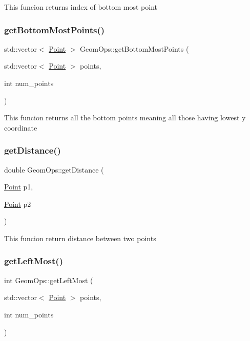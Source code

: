 This funcion returns index of bottom most point \mbox{\label{classGeomOps_acbab4d3b33a391c1169fedec1531212a}} 
\subsubsection{\texorpdfstring{get\+Bottom\+Most\+Points()}{getBottomMostPoints()}}
{\footnotesize\ttfamily std\+::vector$<$ \hyperlink{classPoint}{Point} $>$ Geom\+Ops\+::get\+Bottom\+Most\+Points (\begin{DoxyParamCaption}\item[{std\+::vector$<$ \hyperlink{classPoint}{Point} $>$}]{points,  }\item[{int}]{num\+\_\+points }\end{DoxyParamCaption})}

This funcion returns all the bottom points meaning all those having lowest y coordinate \mbox{\label{classGeomOps_a4febafe2cb836369319d1280f1d73d1b}} 
\subsubsection{\texorpdfstring{get\+Distance()}{getDistance()}}
{\footnotesize\ttfamily double Geom\+Ops\+::get\+Distance (\begin{DoxyParamCaption}\item[{\hyperlink{classPoint}{Point}}]{p1,  }\item[{\hyperlink{classPoint}{Point}}]{p2 }\end{DoxyParamCaption})}

This funcion return distance between two points \mbox{\label{classGeomOps_aa940ff28b586d95c2cbda894d635c332}} 
\subsubsection{\texorpdfstring{get\+Left\+Most()}{getLeftMost()}}
{\footnotesize\ttfamily int Geom\+Ops\+::get\+Left\+Most (\begin{DoxyParamCaption}\item[{std\+::vector$<$ \hyperlink{classPoint}{Point} $>$}]{points,  }\item[{int}]{num\+\_\+points }\end{DoxyParamCaption})}

